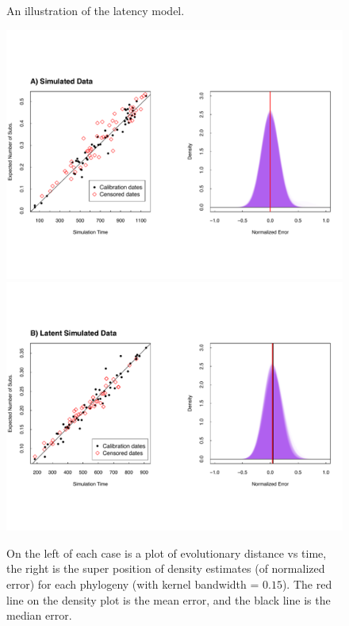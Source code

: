 \documentclass[12pt]{article}
\begin{document}
\begin{figure}[ht]
	\caption[]{An illustration of the latency model.}
	\label{fig:latencymodel}
\end{figure}

\begin{figure}[p]
	\centering
	\includegraphics[width=\textwidth]{figures/simulated.pdf} 
	\includegraphics[width=\textwidth]{figures/simulated_latent.pdf}\\
	\caption[Simulated Data]{On the left of each case is a plot of evolutionary distance vs time, the right is the super position of density estimates (of normalized error) for each phylogeny (with kernel bandwidth = $0.15$). The red line on the density plot is the mean error, and the black line is the median error. }
	 \label{fig:results1}
\end{figure}
\end{document}
